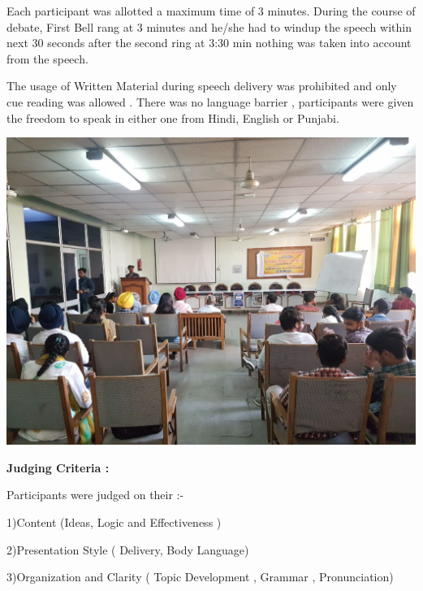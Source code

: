 \documentclass[12pt, a4 paper]{article}
\begin{document}
\begin{center}
\begin{large}
\begin{multicols}{2}
\columnbreak
\large Each participant was allotted a maximum time of 3 minutes. During the course of debate, First Bell rang at 3 minutes and he/she had to windup the speech within next 30 seconds after the second ring at 3:30 min nothing was taken into account from the speech.
  
\end{multicols} 
\bigskip

\bigskip
\begin{multicols}{2}
The usage of Written Material during speech delivery was prohibited and only cue reading was allowed . There was no language barrier , participants were given the freedom to speak in either one from Hindi, English or Punjabi.

\columnbreak
\includegraphics[width=\linewidth]{image2.jpg}

\end{multicols} 

\textbf{Judging Criteria :} 

Participants were judged on their :-

1)Content (Ideas, Logic and Effectiveness )

2)Presentation Style ( Delivery, Body Language)

3)Organization and Clarity ( Topic Development , Grammar , Pronunciation)
\end{large} 
\end{center}

\newpage 
\end{document}
